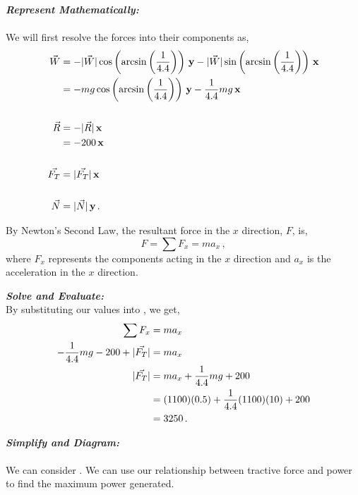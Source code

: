 \begin{subquestions}
\begin{subsubquestions}
\textbf{\textit{Represent Mathematically:}} \\ \\
We will first resolve the forces into their components as,
\begin{align}
	\vec{W} & = -|\vec{W}|\cos\left({\arcsin\left(\frac{1}{4.4}\right)}\right)\,\mathbf{y}-|\vec{W}|\sin\left({\arcsin\left(\frac{1}{4.4}\right)}\right)\,\mathbf{x} \nonumber \\
	        & = -mg\cos\left({\arcsin\left(\frac{1}{4.4}\right)}\right)\,\mathbf{y}-\frac{1}{4.4}mg\,\mathbf{x} \\ \nonumber \\
	\vec{R} & = -|\vec{R}|\,\mathbf{x} \nonumber \\
	        & = -200 \,\mathbf{x} \\ \nonumber \\
	\vec{F_T} & = |\vec{F_T}|\,\mathbf{x} \\ \nonumber \\
	\vec{N} & = |\vec{N}|\,\mathbf{y} \,.
\end{align}

By Newton's Second Law, the resultant force in the $x$ direction, $F$, is,
\begin{equation}
	F = \sum F_x = ma_x \,, \label{2011:q5:Newt1}
\end{equation}
where $F_x$ represents the components acting in the $x$ direction and $a_x$ is the acceleration in the $x$ direction.




\textbf{\textit{Solve and Evaluate:}} \nn \\
By substituting our values into , we get,
\begin{align}
	\sum F_x & = ma_x \nonumber \\
	-\frac{1}{4.4}mg-200+|\vec{F_T}| & = ma_x \nonumber \\
	|\vec{F_T}| & = ma_x +\frac{1}{4.4}mg+200 \nonumber \\
	            & = (1100)(0.5)+\frac{1}{4.4}(1100)(10)+200 \nonumber \\
	            & = 3250 \,.
\end{align}


\subsubquestion

\textbf{\textit{Simplify and Diagram:}} \\ \\
We can consider . We can use our relationship between tractive force and power to find the maximum power generated.





\end{subsubquestions}
\end{subquestions}
